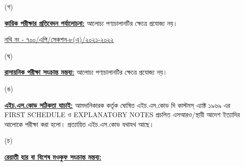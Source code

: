 \documentclass[12pt]{article}
\newcommand{\fileno}{নথি নং - ৭০০/এপি/সেকশন-৮(এ)/২০২১-২০২২}
\newcommand{\filenou}{
\begin{minipage}[t]{0.57\linewidth}
\hspace{1em}
\end{minipage}
\begin{minipage}[t]{0.43\linewidth}
\underline{\fileno}
\end{minipage}
}
\newcommand{\nfpage}{
\newpage
{\filenou}
}
\begin{document}
\begin{minipage}[t]{0.05\linewidth}
\hspace{1em}
\end{minipage}
\begin{minipage}[t]{0.05\linewidth}
(গ)
\end{minipage}
\begin{minipage}[t]{0.90\linewidth}
\underline{\textbf{কায়িক পরীক্ষার প্রতিবেদন পর্যালোচনা:}}
আলোচ্য পণ্যচালানটির ক্ষেত্রে প্রযোজ্য নয়।
\end{minipage}
{\nfpage}
\begin{minipage}[t]{0.05\linewidth}
\hspace{1em}
\end{minipage}
\begin{minipage}[t]{0.05\linewidth}
(ঘ)
\end{minipage}
\begin{minipage}[t]{0.90\linewidth}
\underline{\textbf{রাসায়নিক পরীক্ষা সংক্রান্ত মন্তব্য:}}
আলোচ্য পণ্যচালানটির ক্ষেত্রে প্রযোজ্য নয়।
\\
\end{minipage}
\begin{minipage}[t]{0.05\linewidth}
\hspace{1em}
\end{minipage}
\begin{minipage}[t]{0.05\linewidth}
(ঙ)
\end{minipage}
\begin{minipage}[t]{0.90\linewidth}
\underline{\textbf{এইচ.এস.কোড সঠিকতা যাচাই:}}
আমদানিকারক কর্তৃক ঘোষিত এইচ.এস.কোড দি কাস্টমস্ এ্যাক্ট ১৯৬৯ এর FIRST SCHEDULE ও
EXPLANATORY NOTES প্রচলিত এসআরও/স্থায়ী আদেশ ইত্যাদির আলোকে পরীক্ষা করা হলো।
প্রত্যায়িত এইচ.এস.কোড যথাযথ আছে।
\\
\end{minipage}
\begin{minipage}[t]{0.05\linewidth}
\hspace{1em}
\end{minipage}
\begin{minipage}[t]{0.05\linewidth}
(চ)
\end{minipage}
\begin{minipage}[t]{0.90\linewidth}
\underline{\textbf{রেয়াতী হার বা বিশেষ মওকুফ সংক্রান্ত মন্তব্য:}}
\end{minipage}
\begin{minipage}[t]{0.1\linewidth}
\hspace{1em}
\end{minipage}
\end{document}
